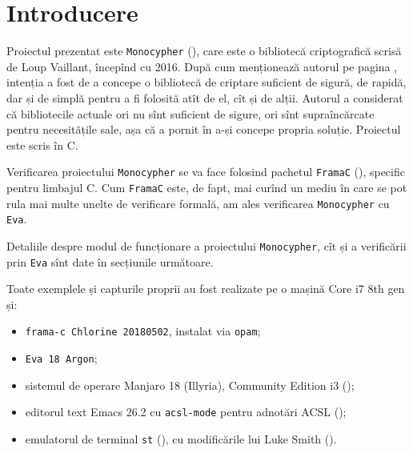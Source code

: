 \chapter*{Introducere}

\indent\indent Proiectul prezentat este \texttt{Monocypher} (\cite{gh1}), care este o bibliotecă
criptografică scrisă de Loup Vaillant, începînd cu 2016. După cum menționează
autorul pe pagina \cite{loupcrypto}, intenția a fost de a concepe o bibliotecă
de criptare suficient de sigură, de rapidă, dar și de simplă pentru a fi folosită
atît de el, cît și de alții. Autorul a considerat că bibliotecile actuale ori nu
sînt suficient de sigure, ori sînt supraîncărcate pentru necesitățile sale,
așa că a pornit în a-și concepe propria soluție. Proiectul este scris în C.

Verificarea proiectului \texttt{Monocypher} se va face folosind pachetul
\texttt{FramaC} (\cite{framac}), specific pentru limbajul C. Cum \texttt{FramaC}
este, de fapt, mai curînd un mediu în care se pot rula mai multe unelte de verificare
formală, am ales verificarea \texttt{Monocypher} cu \texttt{Eva}.

Detaliile despre modul de funcționare a proiectului \texttt{Monocypher}, cît și
a verificării prin \texttt{Eva} sînt date în secțiunile următoare.

\vspace{1cm}

Toate exemplele și capturile proprii au fost realizate pe o mașină Core i7 8th gen și:
\begin{itemize}
\item \texttt{frama-c Chlorine 20180502}, instalat via \texttt{opam};
\item \texttt{Eva 18 Argon};
\item sistemul de operare Manjaro 18 (Illyria), Community Edition i3 (\cite{mi3});
\item editorul text Emacs 26.2 \cite{emacs} cu \texttt{acsl-mode} pentru adnotări ACSL (\cite{acsl-mode});
\item emulatorul de terminal \texttt{st} (\cite{st}), cu modificările lui Luke Smith
  (\cite{lukest}).
\end{itemize}


